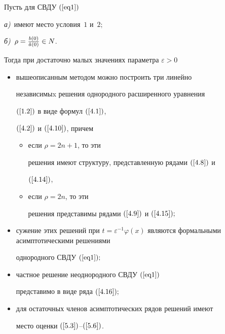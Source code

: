 \begin{thmnonum}


Пусть для СВДУ $(\ref{eq1})$


{\em а)}~имеют место условия~$1$ и~$2;$


{\em б)}~$\rho = \frac{b(0)}{ \Tilde{a} (0)} \in N $.





Тогда при достаточно малых значениях параметра $\varepsilon > 0$


\begin{itemize}


\item[1)] вышеописанным методом можно построить три линейно


независимыx решения однородного расширенного уравнения


$(\ref{1.2})$ в виде формул $(\ref{4.1})$,


$(\ref{4.2})$ и $(\ref{4.10})$, причем


\begin{itemize}


\item[1\;a)] если $ \rho = 2 n + 1$, то эти


решения имеют структуру, представленную рядами $(\ref{4.8})$ и


$(\ref{4.14})$,


\item[1\;b)] если $ \rho = 2 n$, то эти


решения представимы рядами $(\ref{4.9})$ и $(\ref{4.15});$


\end{itemize}


\item[2)] сужение этих решений при $t = \varepsilon^{-1}


\varphi(x)$ являются формальными асимптотическими решениями


однородного СВДУ $(\ref{eq1});$


\item[3)] частное решение неоднородного СВДУ $(\ref{eq1})$


представимо в виде ряда $(\ref{4.16});$


\item[4)] для остаточных членов асимптотических рядов решений имеют


место оценки $(\ref{5.3})$--$(\ref{5.6})$.


\end{itemize}


\end{thmnonum}








